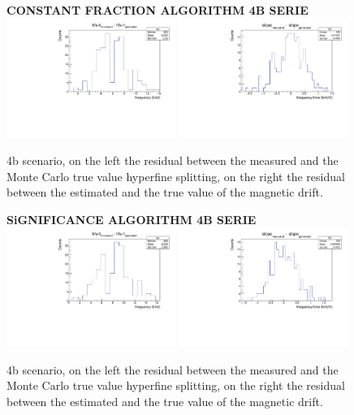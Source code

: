 \documentclass[11pt,a4paper,oneside]{article}
\begin{document}
\begin{figure}[hbtp]
\centering
\textbf{CONSTANT FRACTION ALGORITHM 4B SERIE} \vspace{10pt}\\
\includegraphics[width = 0.49\textwidth]{constantfraction/4bmuonONrise.pdf}
\includegraphics[width = 0.49\textwidth]{constantfraction/4bmuonONrise_slope.pdf}
\caption{4b scenario, on the left the residual between the measured and the Monte Carlo true value hyperfine splitting, on the right the residual between the estimated and the true value of the magnetic drift.}
\end{figure}

\begin{figure}[!hbtp]
\centering
\textbf{SiGNIFICANCE ALGORITHM 4B SERIE} \vspace{10pt}\\
\includegraphics[width = 0.49\textwidth]{significance/4bmuonONrise.pdf}
\includegraphics[width = 0.49\textwidth]{significance/4bmuonONrise_slope.pdf}
\caption{4b scenario, on the left the residual between the measured and the Monte Carlo true value hyperfine splitting, on the right the residual between the estimated and the true value of the magnetic drift.}
\end{figure}
\end{document}
